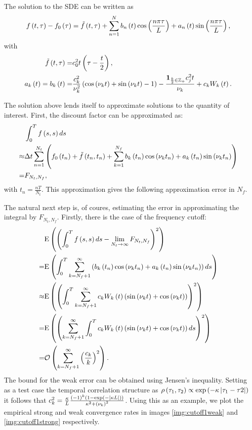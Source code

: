 \documentclass[11pt]{amsart}
\begin{document}
The solution to the SDE can be written as
\begin{align*}
f \left( {t,\tau} \right) - f_0 \left( {\tau} \right)
= \tilde f \left( {t,\tau} \right)
+ \displaystyle\sum\limits_{n=1}^{N} b_n \left( {t} \right) \cos \left( {\frac{n \pi \tau}{L}} \right) + a_n \left( {t} \right) \sin \left( {\frac{n \pi \tau}{L}} \right),
\end{align*}
with
\begin{align}
\tilde f \left( {t,\tau} \right) =& c_0^2 t \left( {\tau-\frac{t}{2}} \right),
\\
a_k \left( {t} \right) = b_k \left( {t} \right) =& \frac{c_k^2}{\nu_{k}^2}\left( {\cos \left( {\nu_{k} t} \right) + \sin \left( {\nu_{k} t} \right)-1 } \right) - \frac{\mathbf{1}_{\frac{k}{2} \in \mathbb Z_+}  c_j^2  t}{\nu_{k}}  + c_k W_k \left( {t} \right) .
\end{align}

The solution above lends itself to approximate solutions to the quantity of interest.
First, the discount factor can be approximated as:
\begin{align*}
&\int_0^{T} f \left( {s,s} \right) ds
\\
\approx& \Delta t \displaystyle\sum\limits_{n=1}^{N_t} \left( { f_0 \left( {t_n} \right) + \tilde f \left( {t_n, t_n} \right) +
\displaystyle\sum\limits_{k=1}^{N_f}
b_k \left( {t_n} \right) \cos \left( { \nu_{k} t_n} \right) + a_k \left( {t_n} \right) \sin \left( {\nu_{k} t_n} \right)
} \right)
\\
=& F_{N_t,N_f}
,
\end{align*}
with $t_n = \frac{nT}{N_t}$.
This approximation gives the following approximation error
in $N_f$.

The natural next step is, of coures, estimating the error in approximating the
integral by $F_{N_t,N_f}$. Firstly, there is the case of the frequency cutoff:
\begin{align*}
&\mathrm{E} \left( {{ \left( {\int_0^T f \left( {s,s} \right) ds - \lim_{N_t \rightarrow \infty} F_{N_t,N_f}} \right)^2}} \right)
\\
=& \mathrm{E} \left( {{\int_0^T \displaystyle\sum\limits_{k=N_f+1}^{\infty} \left( {b_k \left( {t_n} \right) \cos \left( {\nu_{k} t_n} \right) + a_k \left( {t_n} \right) \sin \left( {\nu_{k} t_n} \right)} \right) ds}} \right)
\\
\approx &
\mathrm{E} \left( {{\left( {\int_0^T \displaystyle\sum\limits_{k=N_f+1}^{\infty} c_k W_k \left( {t} \right) \left( {\sin \left( {\nu_{k} t} \right) + \cos \left( {\nu_{k} t} \right) } \right)} \right)^2}} \right)
\\
= &
\mathrm{E} \left( {{\left( { \displaystyle\sum\limits_{k=N_f+1}^{\infty} \int_0^T c_k W_k \left( {t} \right) \left( {\sin \left( {\nu_{k} t} \right) + \cos \left( {\nu_{k} t} \right) } \right) ds} \right)^2}} \right)
\\
= & \mathcal O \left( {{\displaystyle\sum\limits_{k=N_f+1}^{\infty} \left( {\frac{c_k}{k}} \right)^2}} \right).
\end{align*}
The bound for the weak error can be obtained using Jensen's inequality. Setting as a test
case the temporal correlation structure as
$
\rho \left( {\tau_1, \tau_2} \right) \propto \mathrm{exp}\left ( { - \kappa \left| {\tau_1-\tau2} \right|}\right )
$
it follows that $c^2_k =\frac{\kappa}{L} \frac{\left( {-1} \right)^k\left( {1-\mathrm{exp}\left ( {-\left| {\kappa L} \right|}\right )} \right)}{\kappa^2 + \left( {\nu_{k}} \right)^2}$. Using this as an example, we plot the empirical strong and weak convergence rates in images \ref{img:cutoff1weak} and \ref{img:cutoff1strong} respectively.
\end{document}
